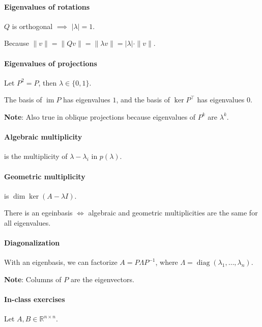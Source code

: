 \documentclass{article}
\begin{document}
\paragraph{Eigenvalues of rotations} $Q$ is orthogonal $\implies$ $|\lambda| = 1$.

Because $\|v\| = \|Q v\| = \|\lambda v\| = |\lambda| \cdot \|v\|$.

\paragraph{Eigenvalues of projections} Let $P^2 = P$, then $\lambda \in \{0, 1\}$.

The basis of $\operatorname{im} P$ has eigenvalues $1$, and the basis of $\operatorname{ker} P^\top$ has eigenvalues $0$.

\textbf{Note}: Also true in oblique projections because eigenvalues of $P^k$ are $\lambda^k$.

\paragraph{Algebraic multiplicity} is the multiplicity of $\lambda-\lambda_i$ in $p(\lambda)$.

\paragraph{Geometric multiplicity} is $\dim \operatorname{ker} (A-\lambda I)$.

There is an egeinbasis $\iff$ algebraic and geometric multiplicities are the same for all eigenvalues.

\paragraph{Diagonalization} With an eigenbasis, we can factorize $A = P\Lambda P^{-1}$, where $\Lambda=\operatorname{diag}(\lambda_1,\dots,\lambda_n)$.

\textbf{Note}: Columns of $P$ are the eigenvectors.


\paragraph{In-class exercises}

Let $A, B \in \mathbb R^{n \times n}$.
\end{document}
